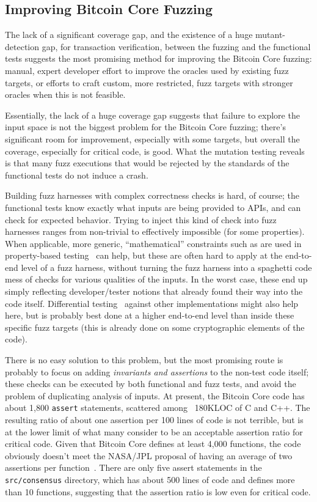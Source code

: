 \subsection{Improving Bitcoin Core Fuzzing}

The lack of a significant coverage gap, and the existence of a huge
mutant-detection gap, for transaction verification, between the fuzzing and the functional tests
suggests the most promising method for improving the Bitcoin Core
fuzzing: manual, expert developer effort to improve the
oracles used by existing fuzz targets, or efforts to craft custom,
more restricted, fuzz targets with stronger oracles when this is not
feasible.

Essentially, the lack of a huge coverage gap suggests that failure to
explore the input space is not the biggest problem for the Bitcoin
Core fuzzing; there's significant room for improvement, especially
with some targets, but overall the coverage, especially for critical
code, is good.  What the mutation testing reveals is that many fuzz
executions that would be rejected by the standards of the functional
tests do not induce a crash.

Building fuzz harnesses with complex correctness checks is hard, of
course; the functional tests know exactly what inputs are being
provided to APIs, and can check for expected behavior.  Trying to
inject this kind of check into fuzz harnesses ranges from non-trivial
to effectively impossible (for some properties).  When
applicable, more generic, ``mathematical'' constraints such as are
used in property-based testing~\cite{ClaessenH00} can help, but these
are often hard to apply at the end-to-end level of a fuzz harness,
without turning the fuzz harness into a spaghetti code mess of
checks for various qualities of the inputs.  In the worst case, these
end up simply reflecting developer/tester notions that already found
their way into the code itself.  Differential testing~\cite{Differential} against other
implementations might also help here, but is probably best done at a
higher end-to-end level than inside these specific fuzz targets (this
is already done on some cryptographic elements of the code).

There is no
easy solution to this problem, but the most promising route is
probably to focus
on adding \emph{invariants and assertions} to the non-test code itself; these checks can be executed by
both functional and fuzz tests, and avoid the problem of duplicating
analysis of inputs.  At
present, the Bitcoin Core code has about 1,800 {\tt assert}
statements, scattered among  ~180KLOC of C and C++.  The resulting ratio
of about one assertion per 100 lines of code is not terrible, but is
at the lower limit of what many consider to be an acceptable assertion
ratio for critical code.
Given that Bitcoin Core defines at least 4,000 functions, the code obviously
doesn't meet the NASA/JPL proposal of having an average of two
assertions per function~\cite{holzmann2006power}.  There are only five assert
statements in the {\tt src/consensus} directory, which has about 500
lines of code and defines more than 10 functions, suggesting that the assertion ratio is low even for
critical code.


